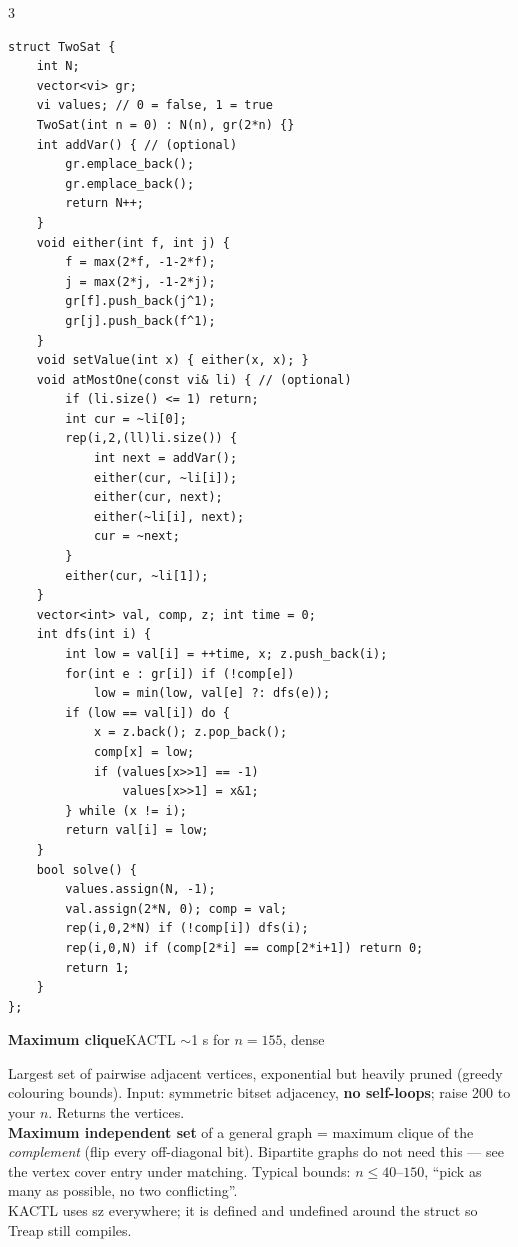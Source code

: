\documentclass[9pt,a4paper]{extarticle}
\newcommand{\entry}[3]{%
  \addcontentsline{toc}{subsection}{#1}%
  \vspace{0.8ex}%
  \noindent\colorbox{hdbg}{\parbox{\dimexpr\columnwidth-2\fboxsep}{%
    \strut\textbf{#1}\hfill{\footnotesize\textsf{#2}}}}\par
  \vspace{0.4ex}%
  {\footnotesize #3\par}%
}
\newcommand{\code}[1]{{\ttfamily\small #1}}
\begin{document}
\begin{multicols*}{3}
\begin{lstlisting}
struct TwoSat {
    int N;
    vector<vi> gr;
    vi values; // 0 = false, 1 = true
    TwoSat(int n = 0) : N(n), gr(2*n) {}
    int addVar() { // (optional)
        gr.emplace_back();
        gr.emplace_back();
        return N++;
    }
    void either(int f, int j) {
        f = max(2*f, -1-2*f);
        j = max(2*j, -1-2*j);
        gr[f].push_back(j^1);
        gr[j].push_back(f^1);
    }
    void setValue(int x) { either(x, x); }
    void atMostOne(const vi& li) { // (optional)
        if (li.size() <= 1) return;
        int cur = ~li[0];
        rep(i,2,(ll)li.size()) {
            int next = addVar();
            either(cur, ~li[i]);
            either(cur, next);
            either(~li[i], next);
            cur = ~next;
        }
        either(cur, ~li[1]);
    }
    vector<int> val, comp, z; int time = 0;
    int dfs(int i) {
        int low = val[i] = ++time, x; z.push_back(i);
        for(int e : gr[i]) if (!comp[e])
            low = min(low, val[e] ?: dfs(e));
        if (low == val[i]) do {
            x = z.back(); z.pop_back();
            comp[x] = low;
            if (values[x>>1] == -1)
                values[x>>1] = x&1;
        } while (x != i);
        return val[i] = low;
    }
    bool solve() {
        values.assign(N, -1);
        val.assign(2*N, 0); comp = val;
        rep(i,0,2*N) if (!comp[i]) dfs(i);
        rep(i,0,N) if (comp[2*i] == comp[2*i+1]) return 0;
        return 1;
    }
};
\end{lstlisting}

\entry{Maximum clique}{KACTL \quad $\sim$1 s for $n = 155$, dense}{%
Largest set of pairwise adjacent vertices, exponential but heavily pruned (greedy
colouring bounds). Input: symmetric \code{bitset} adjacency, \textbf{no self-loops};
raise \code{200} to your $n$. Returns the vertices.\\[0.3ex]
\textbf{Maximum independent set} of a general graph = maximum clique of the
\emph{complement} (flip every off-diagonal bit). Bipartite graphs do not need this ---
see the vertex cover entry under matching. Typical bounds: $n \le 40$--$150$, ``pick as
many as possible, no two conflicting''.\\[0.3ex]
KACTL uses \code{sz} everywhere; it is defined and undefined around the struct so
\code{Treap} still compiles.}


\end{multicols*}
\end{document}
